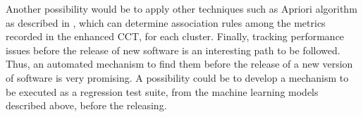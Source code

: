 Another possibility would be to apply other techniques such as Apriori algorithm as described in \cite{apriori}, which can determine association rules among the metrics recorded in the enhanced CCT, for each cluster. Finally, tracking performance issues before the release of new software is an interesting path to be followed. Thus, an automated mechanism to find them before the release of a new version of software is very promising. A possibility could be to develop a mechanism to be executed as a regression test suite, from the machine learning models described above, before the releasing.